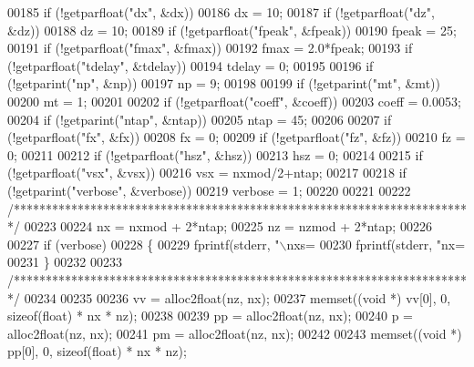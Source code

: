\begin{DoxyCode}
00185     \textcolor{keywordflow}{if} (!getparfloat(\textcolor{stringliteral}{"dx"}, &dx))
00186         dx = 10;
00187     \textcolor{keywordflow}{if} (!getparfloat(\textcolor{stringliteral}{"dz"}, &dz))
00188         dz = 10;
00189     \textcolor{keywordflow}{if} (!getparfloat(\textcolor{stringliteral}{"fpeak"}, &fpeak))
00190         fpeak = 25;
00191     \textcolor{keywordflow}{if} (!getparfloat(\textcolor{stringliteral}{"fmax"}, &fmax))
00192         fmax = 2.0*fpeak;
00193     \textcolor{keywordflow}{if} (!getparfloat(\textcolor{stringliteral}{"tdelay"}, &tdelay))
00194         tdelay = 0;
00195 
00196     \textcolor{keywordflow}{if} (!getparint(\textcolor{stringliteral}{"np"}, &np))
00197         np = 9;
00198 
00199     \textcolor{keywordflow}{if} (!getparint(\textcolor{stringliteral}{"mt"}, &mt))
00200         mt = 1;
00201 
00202     \textcolor{keywordflow}{if} (!getparfloat(\textcolor{stringliteral}{"coeff"}, &coeff))
00203         coeff = 0.0053;
00204     \textcolor{keywordflow}{if} (!getparint(\textcolor{stringliteral}{"ntap"}, &ntap))
00205         ntap = 45;
00206 
00207     \textcolor{keywordflow}{if} (!getparfloat(\textcolor{stringliteral}{"fx"}, &fx))
00208         fx = 0;
00209     \textcolor{keywordflow}{if} (!getparfloat(\textcolor{stringliteral}{"fz"}, &fz))
00210         fz = 0;
00211 
00212     \textcolor{keywordflow}{if} (!getparfloat(\textcolor{stringliteral}{"hsz"}, &hsz))
00213         hsz = 0;
00214 
00215     \textcolor{keywordflow}{if} (!getparfloat(\textcolor{stringliteral}{"vsx"}, &vsx))
00216         vsx = nxmod/2+ntap;
00217 
00218     \textcolor{keywordflow}{if} (!getparint(\textcolor{stringliteral}{"verbose"}, &verbose))
00219         verbose = 1;
00220 
00221 
00222     \textcolor{comment}{/************************************************************************/}
00223 
00224     nx = nxmod + 2*ntap;
00225     nz = nzmod + 2*ntap;
00226 
00227     \textcolor{keywordflow}{if} (verbose)
00228     \{
00229         fprintf(stderr, \textcolor{stringliteral}{"\(\backslash\)nxs=%
00230         fprintf(stderr, \textcolor{stringliteral}{"nx=%
00231     \}
00232 
00233     \textcolor{comment}{/************************************************************************/}
00234 
00235 
00236     vv = alloc2float(nz, nx);
00237     memset((\textcolor{keywordtype}{void} *) vv[0], 0, \textcolor{keyword}{sizeof}(\textcolor{keywordtype}{float}) * nx * nz);
00238 
00239     pp = alloc2float(nz, nx);
00240     p = alloc2float(nz, nx);
00241     pm = alloc2float(nz, nx);
00242 
00243     memset((\textcolor{keywordtype}{void} *) pp[0], 0, \textcolor{keyword}{sizeof}(\textcolor{keywordtype}{float}) * nx * nz);
}}
\end{DoxyCode}
